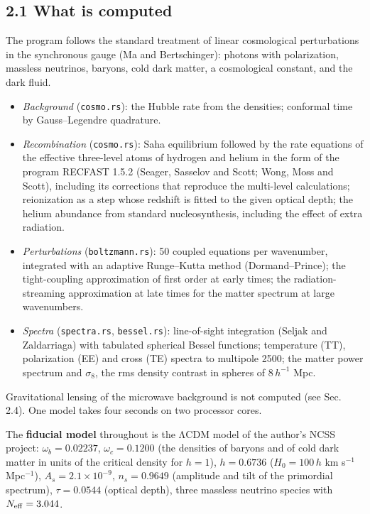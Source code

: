 \documentclass[
  10pt,
]{article}
\providecommand{\tightlist}{%
  \setlength{\itemsep}{0pt}\setlength{\parskip}{0pt}}
\begin{document}
\hypertarget{what-is-computed}{%
\subsection{2.1 What is computed}\label{what-is-computed}}

The program follows the standard treatment of linear cosmological
perturbations in the synchronous gauge (Ma and Bertschinger): photons
with polarization, massless neutrinos, baryons, cold dark matter, a
cosmological constant, and the dark fluid.

\begin{itemize}
\tightlist
\item
  \emph{Background} (\texttt{cosmo.rs}): the Hubble rate from the
  densities; conformal time by Gauss--Legendre quadrature.
\item
  \emph{Recombination} (\texttt{cosmo.rs}): Saha equilibrium followed by
  the rate equations of the effective three-level atoms of hydrogen and
  helium in the form of the program RECFAST 1.5.2 (Seager, Sasselov and
  Scott; Wong, Moss and Scott), including its corrections that reproduce
  the multi-level calculations; reionization as a step whose redshift is
  fitted to the given optical depth; the helium abundance from standard
  nucleosynthesis, including the effect of extra radiation.
\item
  \emph{Perturbations} (\texttt{boltzmann.rs}): 50 coupled equations per
  wavenumber, integrated with an adaptive Runge--Kutta method
  (Dormand--Prince); the tight-coupling approximation of first order at
  early times; the radiation-streaming approximation at late times for
  the matter spectrum at large wavenumbers.
\item
  \emph{Spectra} (\texttt{spectra.rs}, \texttt{bessel.rs}):
  line-of-sight integration (Seljak and Zaldarriaga) with tabulated
  spherical Bessel functions; temperature (TT), polarization (EE) and
  cross (TE) spectra to multipole 2500; the matter power spectrum and
  \(\sigma_8\), the rms density contrast in spheres of \(8\,h^{-1}\)
  Mpc.
\end{itemize}

Gravitational lensing of the microwave background is not computed (see
Sec. 2.4). One model takes four seconds on two processor cores.

The \textbf{fiducial model} throughout is the ΛCDM model of the author's
NCSS project: \(\omega_b=0.02237\), \(\omega_c=0.1200\) (the densities
of baryons and of cold dark matter in units of the critical density for
\(h=1\)), \(h=0.6736\) (\(H_0=100\,h\) km s\(^{-1}\) Mpc\(^{-1}\)),
\(A_s=2.1\times10^{-9}\), \(n_s=0.9649\) (amplitude and tilt of the
primordial spectrum), \(\tau=0.0544\) (optical depth), three massless
neutrino species with \(N_{\rm eff}=3.044\).
\end{document}
